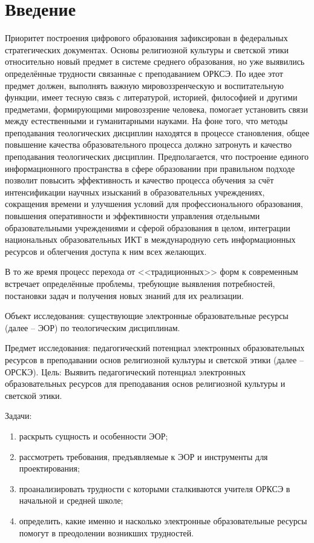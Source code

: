 \tableofcontents
\newpage
\large
\section*{Введение}
Приоритет построения цифрового образования зафиксирован в федеральных стратегических документах\cite{fsd}. 
Основы религиозной культуры и светской этики относительно новый предмет в системе среднего образования, но уже выявились определённые трудности связанные с преподаванием ОРКСЭ. По идее этот предмет должен, выполнять важную мировоззренческую и воспитательную функции, имеет тесную связь с литературой, историей, философией и другими предметами, формирующими мировоззрение человека, помогает установить связи между естественными и гуманитарными науками.
На фоне того, что методы преподавания теологических дисциплин находятся в процессе становления, общее повышение качества образовательного процесса должно затронуть и качество преподавания теологических дисциплин.
Предполагается, что построение единого информационного пространства в сфере образовании при правильном подходе позволит повысить эффективность и качество процесса обучения за счёт интенсификации научных изысканий в образовательных учреждениях, сокращения времени и улучшения условий для профессионального образования, повышения оперативности и эффективности управления отдельными образовательными учреждениями и сферой образования в целом, интеграции национальных образовательных ИКТ в международную сеть информационных ресурсов и облегчения доступа к ним всех желающих.

В то же время процесс перехода от <<традиционных>> форм к современным встречает определённые проблемы, требующие выявления потребностей, постановки задач и получения новых знаний для их реализации.

Объект исследования: \label{obj} существующие электронные образовательные ресурсы (далее – ЭОР) по теологическим дисциплинам.

Предмет исследования: \label{subj} педагогический потенциал электронных образовательных ресурсов в преподавании основ религиозной культуры и светской этики (далее – ОРСКЭ). 
\newpage
Цель:\label{goal}  Выявить педагогический потенциал электронных образовательных ресурсов для преподавания основ религиозной культуры и светской этики.

Задачи:
\begin{enumerate}
\item\label{task1} раскрыть сущность и особенности ЭОР;
\item\label{task2} рассмотреть требования, предъявляемые к ЭОР и инструменты для проектирования; 
\item\label{task3} проанализировать трудности с которыми сталкиваются учителя ОРКСЭ в начальной и средней школе;
\item\label{task4}  определить, какие именно и насколько электронные образовательные ресурсы помогут в преодолении возникших трудностей.
\end{enumerate}

